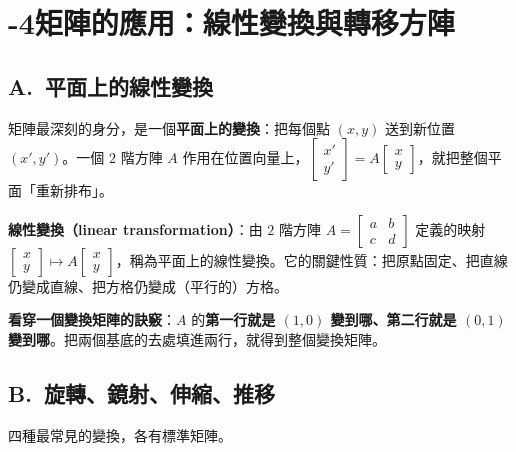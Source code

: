 \documentclass[11pt]{article}
\begin{document}
\section*{-4\quad 矩陣的應用：線性變換與轉移方陣}

\subsection*{\sffamily A.\ 平面上的線性變換}

矩陣最深刻的身分，是一個\textbf{平面上的變換}：把每個點 $(x,y)$ 送到新位置 $(x',y')$。一個 $2$ 階方陣 $A$ 作用在位置向量上，$\begin{bmatrix} x'\\ y' \end{bmatrix}=A\begin{bmatrix} x\\ y \end{bmatrix}$，就把整個平面「重新排布」。

\textbf{線性變換（linear transformation）}：由 $2$ 階方陣 $A=\begin{bmatrix} a & b\\ c & d \end{bmatrix}$ 定義的映射 $\begin{bmatrix} x\\ y \end{bmatrix}\mapsto A\begin{bmatrix} x\\ y \end{bmatrix}$，稱為平面上的線性變換。它的關鍵性質：把原點固定、把直線仍變成直線、把方格仍變成（平行的）方格。

\textbf{看穿一個變換矩陣的訣竅}：$A$ 的\textbf{第一行就是 $(1,0)$ 變到哪、第二行就是 $(0,1)$ 變到哪}。把兩個基底的去處填進兩行，就得到整個變換矩陣。


\subsection*{\sffamily B.\ 旋轉、鏡射、伸縮、推移}

四種最常見的變換，各有標準矩陣。
\end{document}

